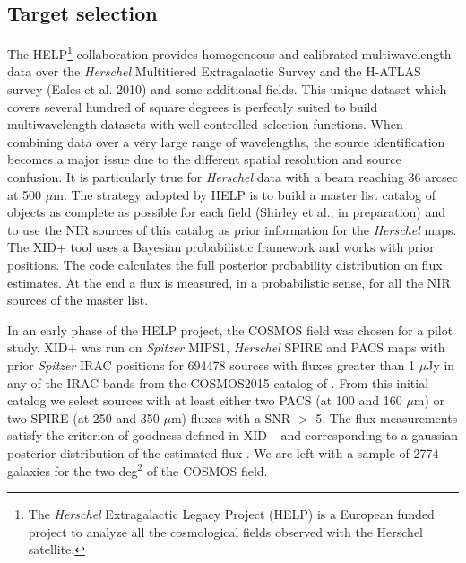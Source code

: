 \documentclass{aa}
\begin{document}
\subsection{Target selection}

The HELP\footnote{The {\it Herschel} Extragalactic Legacy Project (HELP) is a European funded project to analyze all the cosmological fields observed with the Herschel satellite.}  collaboration provides homogeneous and calibrated multiwavelength data over  the {\it Herschel}  Multitiered Extragalactic Survey \citep[HerMES,][]{Oliver12}  and the  H-ATLAS survey (Eales et al. 2010) and some additional fields.  This unique dataset which covers   several hundred of square degrees is perfectly suited to build multiwavelength datasets with  well controlled selection functions. When combining data over a very large range of wavelengths, the source identification becomes a major issue due to the different spatial resolution and  source confusion. It is particularly true for {\it Herschel}  data with a beam reaching 36 arcsec at 500 $\mu$m. The  strategy adopted by HELP is to build a master list catalog of objects  as complete as possible for each field (Shirley et al., in preparation) and to use the NIR sources of this catalog as prior information for the {\it Herschel}  maps. The  XID+ tool \citep{Hurley17} uses a  Bayesian probabilistic framework  and works with prior positions. The code calculates the full posterior probability distribution on flux estimates. At the end a flux is  measured, in a probabilistic sense, for all the NIR sources of the master list.

In an early phase of the HELP project, the COSMOS field was chosen for a pilot study.  XID+ was run on {\it Spitzer} MIPS1,   {\it Herschel}  SPIRE   and PACS maps  with prior {\it Spitzer} IRAC positions for 694478 sources  with fluxes greater than 1 $\mu$Jy in any of the IRAC bands from the COSMOS2015 catalog of \citet{Laigle16}.
From this initial catalog we  select sources with at least either two PACS (at 100 and 160 $\mu$m) or  two   SPIRE  (at 250 and  350  $\mu$m) fluxes   with a SNR $>$ 5. The flux measurements  satisfy the criterion of goodness defined in XID+ and corresponding to a gaussian posterior distribution  of the estimated flux \citep{Hurley17}.  We are left with a sample of 2774 galaxies for the  two deg$^2$ of the COSMOS field.
\end{document}
